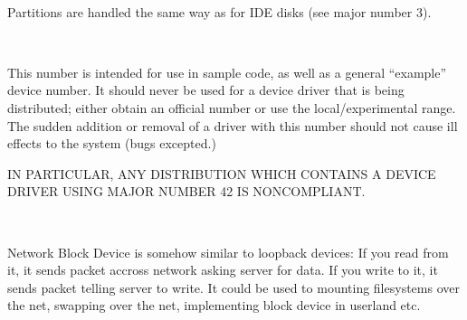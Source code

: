 \begin{devicelist}
\\
\end{devicelist}

\noindent
Partitions are handled the same way as for IDE disks (see major number
3).

\begin{devicelist}
\\
\end{devicelist}

\begin{devicelist}
\end{devicelist}

\noindent
This number is intended for use in sample code, as well as a general
``example'' device number.  It should never be used for a device
driver that is being distributed; either obtain an official number or
use the local/experimental range.  The sudden addition or removal of a
driver with this number should not cause ill effects to the system
(bugs excepted.)

IN PARTICULAR, ANY DISTRIBUTION WHICH CONTAINS A DEVICE DRIVER USING
MAJOR NUMBER 42 IS NONCOMPLIANT.

\begin{devicelist}
	\minordots
\\
	\minordots
\end{devicelist}

\noindent
Network Block Device is somehow similar to loopback devices: If you
read from it, it sends packet accross network asking server for
data. If you write to it, it sends packet telling server to write. It
could be used to mounting filesystems over the net, swapping over the
net, implementing block device in userland etc.

\begin{devicelist}
	\minordots
\\
        \minordots
\end{devicelist}

